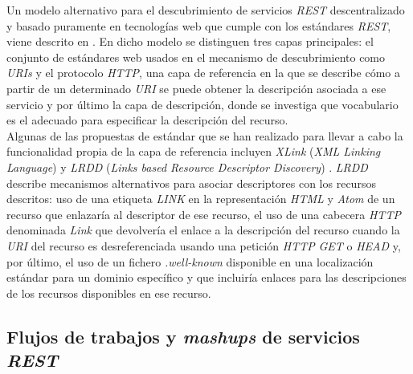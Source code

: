 Un modelo alternativo para el descubrimiento de servicios \textit{REST} descentralizado y basado puramente en tecnolog\'ias web que cumple con los est\'andares \textit{REST}, viene descrito en \cite{umbrich2009discovering}. En dicho modelo se distinguen tres capas principales: el conjunto de est\'andares web usados en el mecanismo de descubrimiento como \textit{URIs} y el protocolo \textit{HTTP}, una capa de referencia en la que se describe c\'omo a partir de un determinado \textit{URI} se puede obtener la descripci\'on asociada a ese servicio y por \'ultimo la capa de descripci\'on, donde se investiga que vocabulario es el adecuado para especificar la descripci\'on del recurso.\\
Algunas de las propuestas de est\'andar que se han realizado para llevar a cabo la funcionalidad propia de la capa de referencia incluyen \textit{XLink} (\textit{XML Linking Language})  y \textit{LRDD} (\textit{Links based Resource Descriptor Discovery}) \cite{lrdd}. \textit{LRDD} describe mecanismos alternativos para asociar descriptores con los recursos descritos: uso de una etiqueta \textit{LINK} en la representaci\'on \textit{HTML} y \textit{Atom} de un recurso que enlazar\'ia al descriptor de ese recurso, el uso de una cabecera \textit{HTTP} denominada \textit{Link} que devolver\'ia el enlace a la descripci\'on del recurso cuando la \textit{URI} del recurso es desreferenciada usando una petici\'on \textit{HTTP} \textit{GET} o \textit{HEAD} y, por \'ultimo, el uso de un fichero \textit{.well-known} disponible en una localizaci\'on est\'andar para un dominio espec\'ifico y que incluir\'ia enlaces para las descripciones de los recursos disponibles en ese recurso.\\

\subsection{Flujos de trabajos y \textit{mashups} de servicios \textit{REST}}

